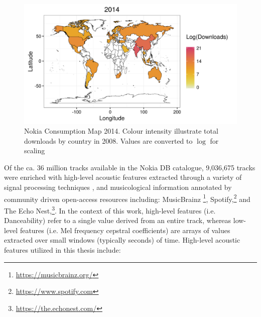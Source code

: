 \documentclass[a4paper]{article}
\begin{document}
\begin{figure}[h!]
\centering
\includegraphics[width=\linewidth]{nokiaMap14}
\caption[Nokia Consumption Map - 2014]{Nokia Consumption Map 2014. Colour intensity illustrate total downloads by country in 2008. Values are converted to $\log$ for scaling}
\label{fig:nokiamap14}
\end{figure}

Of the ca. 36 million tracks available in the Nokia DB catalogue, 9,036,675 tracks were enriched with high-level acoustic features extracted through a variety of signal processing techniques \cite{bogdanov2013essentia,Bogdanov2009FromMeasures}, and musicological information annotated by community driven open-access resources including: MusicBrainz \cite{swartz2002musicbrainz,vigliensoni:00,porter2015acousticbrainz}\footnote{\url{https://musicbrainz.org/}}, Spotify,\footnote{\url{https://www.spotify.com}} and The Echo Nest,\footnote{\url{https://the.echonest.com/}}. In the context of this work, high-level features (i.e. Danceability) refer to a single value derived from an entire track, whereas low-level features (i.e. Mel frequency cepstral coefficients) are arrays of values extracted over small windows (typically seconds) of time.  High-level acoustic features utilized in this thesis include:
\end{document}
